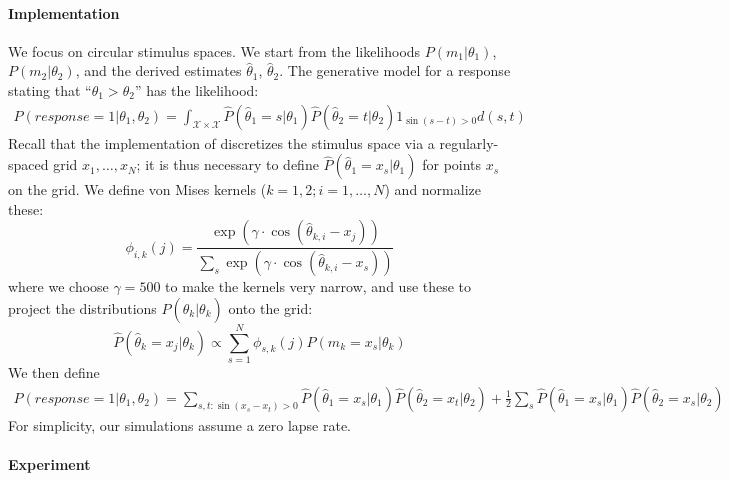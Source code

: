 \documentclass[si.tex]{subfiles}
\begin{document}
\paragraph*{Implementation}
We focus on circular stimulus spaces.
We start from the likelihoods $P(m_1|\theta_1)$, $P(m_2|\theta_2)$, and the derived estimates $\widehat{\theta}_1$, $\widehat{\theta}_2$.
The generative model for a response stating that ``$\theta_1 > \theta_2$'' has the likelihood:
\begin{align*}
    P(response=1|\theta_1, \theta_2) = \int_{\mathcal{X} \times \mathcal{X}} \widehat{P}(\widehat{\theta}_1=s|\theta_1) \widehat{P}(\widehat{\theta}_2=t|\theta_2) 1_{\sin(s-t) > 0} d(s,t)
\end{align*}
Recall that the implementation of \citet{hahn2024unifying} discretizes the stimulus space via a regularly-spaced grid $x_1, \dots, x_N$; it is thus necessary to define $\widehat{P}(\widehat{\theta}_1=x_s|\theta_1)$ for points $x_s$ on the grid.
We define von Mises kernels ($k=1,2; i = 1, \dots, N$) and normalize these:
\begin{equation}
    \phi_{i,k}(j) = \frac{\exp(\gamma \cdot \cos(\widehat{\theta}_{k,i} - x_j))}{\sum_s \exp(\gamma \cdot \cos(\widehat{\theta}_{k,i} - x_s))}
\end{equation}
where we choose $\gamma = 500$ to make the kernels very narrow, and use these to project the distributions $P(\widehat{\theta}_k|\theta_k)$ onto the grid:
\begin{equation}
    \widehat{P}(\widehat{\theta}_k=x_j|\theta_k) \propto \sum_{s=1}^N \phi_{s,k}(j) P(m_k = x_s|\theta_k)
\end{equation}
We then define
\begin{align*}
    P(response=1|\theta_1, \theta_2) = \sum_{s,t : \sin(x_s-x_t) > 0} \widehat{P}(\widehat{\theta}_1=x_s|\theta_1) \widehat{P}(\widehat{\theta}_2=x_t|\theta_2) + \frac{1}{2} \sum_{s} \widehat{P}(\widehat{\theta}_1=x_s|\theta_1) \widehat{P}(\widehat{\theta}_2=x_s|\theta_2)
\end{align*}
For simplicity, our simulations assume a zero lapse rate.

\paragraph*{Experiment}
\end{document}

